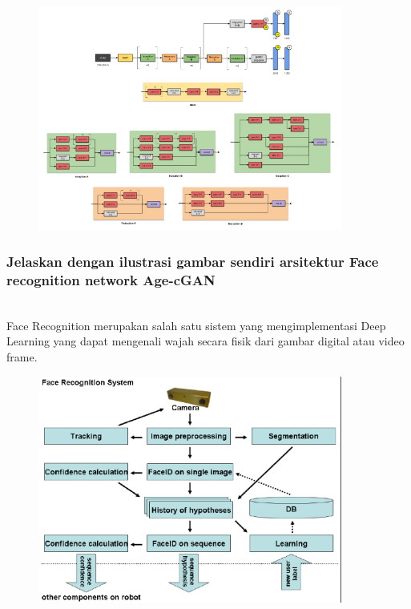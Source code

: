 	\begin{figure}[H]
		\begin{center}
		 \includegraphics[width=10cm]{figures/1174076/figures9/teori6.png}
		 \caption{}	
		\end{center}
	\end{figure}
	
	\subsubsection{Jelaskan dengan ilustrasi gambar sendiri arsitektur Face recognition network Age-cGAN}
	\hfill\\
	Face Recognition merupakan salah satu sistem yang mengimplementasi Deep Learning yang dapat mengenali wajah secara fisik dari gambar digital atau video frame.
	
	\begin{figure}[H]
		\begin{center}
		 \includegraphics[width=10cm]{figures/1174076/figures9/teori7.png}
		 \caption{}	
		\end{center}
	\end{figure}
	
